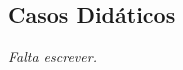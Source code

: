 
%

\begin{apendicesenv}
\partapendices

\chapter{Casos Didáticos}
\label{Chapter:SpatialTemporalOperators}

\textit{Falta escrever.}

\end{apendicesenv}

